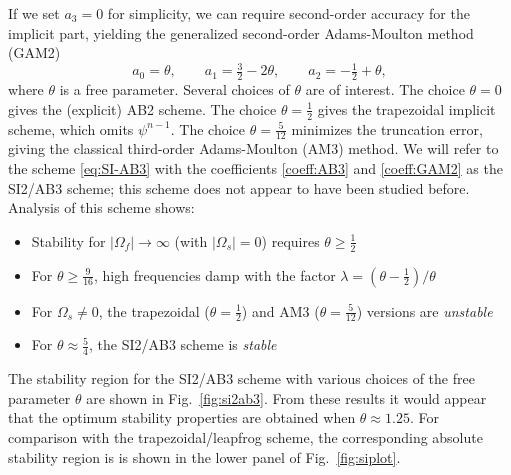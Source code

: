 \documentclass[12pt]{article}
\begin{document}
If we set $a_3=0$ for simplicity, we can require second-order accuracy for 
the implicit part, yielding the generalized second-order Adams-Moulton 
method (GAM2)
\begin{equation}
a_0 =  \theta,
\qquad
a_1 =  \tfrac32 - 2\theta,
\qquad
a_2 = -\tfrac12 + \theta,
\label{coeff:GAM2}
\end{equation}
where $\theta$ is a free parameter.  Several choices of $\theta$ are of
interest.  The choice $\theta=0$ gives the (explicit) AB2 scheme.
The choice $\theta=\tfrac12$ gives the trapezoidal implicit scheme,
which omits $\psi^{n-1}$.  The choice $\theta=\tfrac{5}{12}$ minimizes the
truncation error, giving the classical third-order Adams-Moulton (AM3) method.
We will refer to the scheme \eqref{eq:SI-AB3} with the coefficients
\eqref{coeff:AB3} and \eqref{coeff:GAM2} as the SI2/AB3 scheme; this scheme
does not appear to have been studied before.  Analysis of this scheme shows:
{\setlength{\parskip}{0pt}
\begin{itemize}
\setlength{\itemsep}{2pt} \setlength{\parsep}{0pt}
\setlength{\topsep}{0pt} \setlength{\partopsep}{0pt}
\item Stability for $|\Omega_f|\to\infty$ (with $|\Omega_s|=0$)
requires $\theta\ge\tfrac12$
\item For $\theta\ge\tfrac{9}{16}$, high frequencies damp with the factor
$\lambda=(\theta-\tfrac12)/\theta$
\item For $\Omega_s\ne0$, the trapezoidal ($\theta=\tfrac12$)
and AM3 ($\theta=\tfrac{5}{12}$) versions are \emph{unstable}
\item For $\theta\approx\tfrac54$, the SI2/AB3 scheme is \emph{stable}
\end{itemize}
}
\noindent
The stability region for the SI2/AB3 scheme with various choices of the free
parameter $\theta$ are shown in Fig.~\ref{fig:si2ab3}.  From these
results it would appear that the optimum stability properties are obtained
when $\theta\approx1.25$.  For comparison with the trapezoidal/leapfrog
scheme, the corresponding absolute stability region is is shown in the lower
panel of Fig.~\ref{fig:siplot}.  
\end{document}
